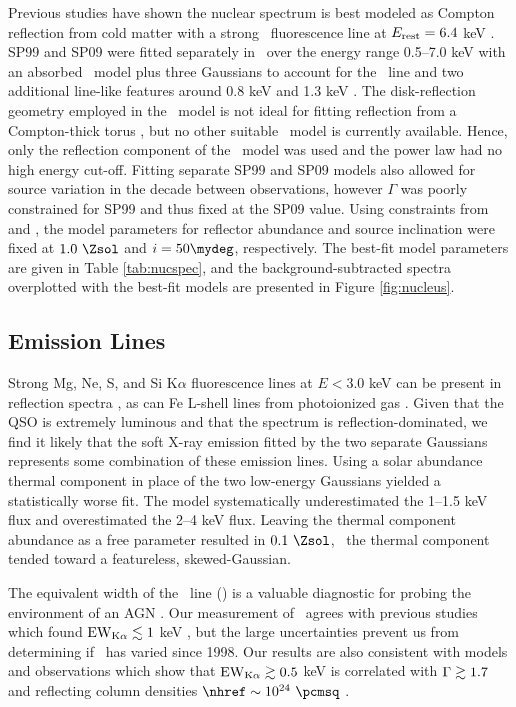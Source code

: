 \documentclass[useAMS,usenatbib]{mn2e}
\begin{document}
Previous studies have shown the nuclear spectrum is best modeled as
Compton reflection from cold matter with a strong \feka\ fluorescence
line at $E_{\rm{rest}} = 6.4$ keV
\citep[\eg][]{2001MNRAS.321L..15I}. SP99 and SP09 were fitted
separately in \xspec\ over the energy range 0.5--7.0 keV with an
absorbed \pexrav\ model \citep{pexrav} plus three Gaussians to account
for the \feka\ line and two additional line-like features around 0.8
keV and 1.3 keV \citep[see also][]{2001MNRAS.321L..15I}. The
disk-reflection geometry employed in the \pexrav\ model is not ideal
for fitting reflection from a Compton-thick torus
\citep{2009MNRAS.397.1549M}, but no other suitable \xspec\ model is
currently available. Hence, only the reflection component of the
\pexrav\ model was used and the power law had no high energy
cut-off. Fitting separate SP99 and SP09 models also allowed for source
variation in the decade between observations, however $\Gamma$ was
poorly constrained for SP99 and thus fixed at the SP09 value. Using
constraints from \citet{1997A&A...318L...1T} and
\citet{2000AJ....120..562T}, the model parameters for reflector
abundance and source inclination were fixed at $1.0 ~\Zsol$ and $i =
50\mydeg$, respectively. The best-fit model parameters are given in
Table \ref{tab:nucspec}, and the background-subtracted spectra
overplotted with the best-fit models are presented in Figure
\ref{fig:nucleus}.

\subsection{Emission Lines}

Strong Mg, Ne, S, and Si K$\alpha$ fluorescence lines at $E < 3.0$ keV
can be present in reflection spectra \citep{1991MNRAS.249..352G}, as
can Fe L-shell lines from photoionized gas
\citep{1990ApJ...362...90B}. Given that the QSO is extremely luminous
and that the spectrum is reflection-dominated, we find it likely that
the soft X-ray emission fitted by the two separate Gaussians
represents some combination of these emission lines. Using a solar
abundance thermal component in place of the two low-energy Gaussians
yielded a statistically worse fit. The model systematically
underestimated the 1--1.5 keV flux and overestimated the 2--4 keV
flux. Leaving the thermal component abundance as a free parameter
resulted in $0.1 ~\Zsol$, \ie\ the thermal component tended toward a
featureless, skewed-Gaussian.

The equivalent width of the \feka\ line (\fekaew) is a valuable
diagnostic for probing the environment of an AGN \citep[see][for a
  review]{2000PASP..112.1145F}. Our measurement of \fekaew\ agrees
with previous studies which found $\mathrm{EW}_{\mathrm{K}\alpha} \lesssim 1$ keV
\citep{2000A&A...353..910F, 2001MNRAS.321L..15I, 2007A&A...473...85P},
but the large uncertainties prevent us from determining if
\fekaew\ has varied since 1998. Our results are also consistent with
models and observations which show that $\mathrm{EW}_{\mathrm{K}\alpha} \gtrsim 0.5$ keV is
correlated with $\Gamma \gtrsim 1.7$ and reflecting column densities
$\nhref \sim 10^{24} ~\pcmsq$ \citep{1996MNRAS.280..823M,
  1997ApJ...477..602N, 1999MNRAS.303L..11Z, 2005A&A...444..119G}.
\end{document}
